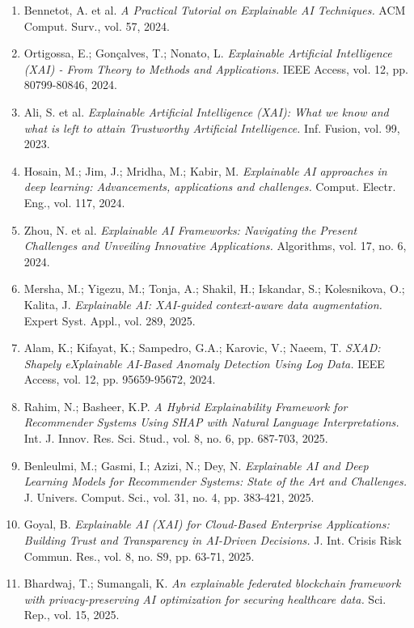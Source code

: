 \begin{enumerate}
    \item Bennetot, A. et al. \textit{A Practical Tutorial on Explainable AI Techniques.} ACM Comput. Surv., vol. 57, 2024.
    
    \item Ortigossa, E.; Gonçalves, T.; Nonato, L. \textit{Explainable Artificial Intelligence (XAI) - From Theory to Methods and Applications.} IEEE Access, vol. 12, pp. 80799-80846, 2024.
    
    \item Ali, S. et al. \textit{Explainable Artificial Intelligence (XAI): What we know and what is left to attain Trustworthy Artificial Intelligence.} Inf. Fusion, vol. 99, 2023.
    
    \item Hosain, M.; Jim, J.; Mridha, M.; Kabir, M. \textit{Explainable AI approaches in deep learning: Advancements, applications and challenges.} Comput. Electr. Eng., vol. 117, 2024.
    
    \item Zhou, N. et al. \textit{Explainable AI Frameworks: Navigating the Present Challenges and Unveiling Innovative Applications.} Algorithms, vol. 17, no. 6, 2024.
    
    \item Mersha, M.; Yigezu, M.; Tonja, A.; Shakil, H.; Iskandar, S.; Kolesnikova, O.; Kalita, J. \textit{Explainable AI: XAI-guided context-aware data augmentation.} Expert Syst. Appl., vol. 289, 2025.
    
    \item Alam, K.; Kifayat, K.; Sampedro, G.A.; Karovic, V.; Naeem, T. \textit{SXAD: Shapely eXplainable AI-Based Anomaly Detection Using Log Data.} IEEE Access, vol. 12, pp. 95659-95672, 2024.
    
    \item Rahim, N.; Basheer, K.P. \textit{A Hybrid Explainability Framework for Recommender Systems Using SHAP with Natural Language Interpretations.} Int. J. Innov. Res. Sci. Stud., vol. 8, no. 6, pp. 687-703, 2025.
    
    \item Benleulmi, M.; Gasmi, I.; Azizi, N.; Dey, N. \textit{Explainable AI and Deep Learning Models for Recommender Systems: State of the Art and Challenges.} J. Univers. Comput. Sci., vol. 31, no. 4, pp. 383-421, 2025.
    
    \item Goyal, B. \textit{Explainable AI (XAI) for Cloud-Based Enterprise Applications: Building Trust and Transparency in AI-Driven Decisions.} J. Int. Crisis Risk Commun. Res., vol. 8, no. S9, pp. 63-71, 2025.
    
    \item Bhardwaj, T.; Sumangali, K. \textit{An explainable federated blockchain framework with privacy-preserving AI optimization for securing healthcare data.} Sci. Rep., vol. 15, 2025.
\end{enumerate}
